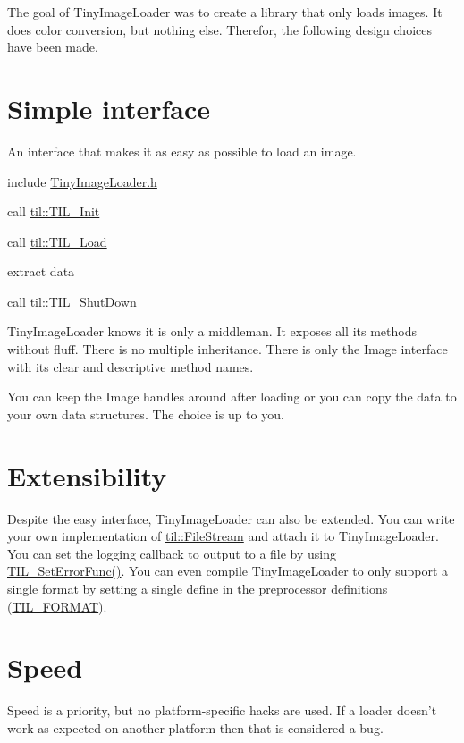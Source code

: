 The goal of TinyImageLoader was to create a library that only loads images. It does color conversion, but nothing else. Therefor, the following design choices have been made.\hypertarget{design_interface}{}\section{Simple interface}\label{design_interface}
An interface that makes it as easy as possible to load an image.


\begin{DoxyItemize}
\item include \hyperlink{_tiny_image_loader_8h}{TinyImageLoader.h}
\item call \hyperlink{namespacetil_a84a20b430c5ae27956968ef6d7a6425b}{til::TIL\_\-Init}
\item call \hyperlink{namespacetil_a8d2e2ab942bb94b188587509ccb754de}{til::TIL\_\-Load}
\item extract data
\item call \hyperlink{namespacetil_a777e336727a478c4c4bdfd8c0e3603d7}{til::TIL\_\-ShutDown}
\end{DoxyItemize}

TinyImageLoader knows it is only a middleman. It exposes all its methods without fluff. There is no multiple inheritance. There is only the Image interface with its clear and descriptive method names.

You can keep the Image handles around after loading or you can copy the data to your own data structures. The choice is up to you.\hypertarget{design_extensibility}{}\section{Extensibility}\label{design_extensibility}
Despite the easy interface, TinyImageLoader can also be extended. You can write your own implementation of \hyperlink{classtil_1_1_file_stream}{til::FileStream} and attach it to TinyImageLoader. You can set the logging callback to output to a file by using \hyperlink{namespacetil_acf5fe389d33053c01da96da10ef88b0e}{TIL\_\-SetErrorFunc()}. You can even compile TinyImageLoader to only support a single format by setting a single define in the preprocessor definitions (\hyperlink{_t_i_l_settings_8h_ae0783dd47fcd9fe85766834d4fa8006d}{TIL\_\-FORMAT}).\hypertarget{design_speed}{}\section{Speed}\label{design_speed}
Speed is a priority, but no platform-\/specific hacks are used. If a loader doesn't work as expected on another platform then that is considered a bug. 